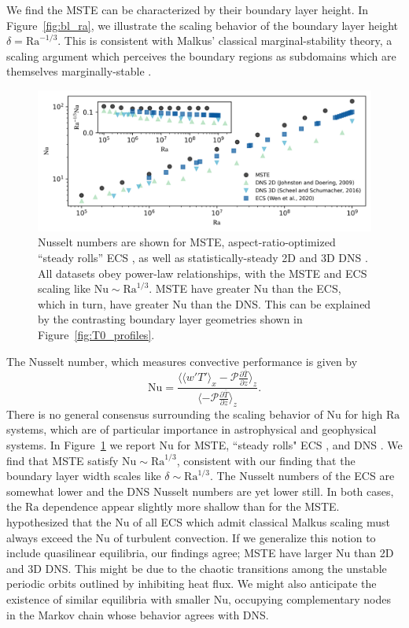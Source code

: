 \documentclass[reprint,amsmath,amssymb,aps]{revtex4-1}
\newcommand\Ra{\mathrm{Ra}}
\newcommand\Nu{\mathrm{Nu}}
\begin{document}
We find the MSTE can be characterized by their boundary layer height.
In Figure~\ref{fig:bl_ra}, we illustrate the scaling behavior of the boundary layer height $\delta = \Ra^{-1/3}$. 
This is consistent with Malkus' classical marginal-stability theory, a scaling argument which perceives the boundary regions as subdomains which are themselves marginally-stable \cite{Malkus_1954}.

\begin{figure}
    \centering
    \includegraphics[width=7.1in]{nu_ra.PNG}
    \caption{Nusselt numbers are shown for MSTE, aspect-ratio-optimized ``steady rolls'' ECS \cite{Wen}, as well as statistically-steady 2D and 3D DNS \cite{Johnston, Scheel_2016}.
    All datasets obey power-law relationships, with the MSTE and ECS scaling like $\Nu \sim\Ra^{1/3}$. 
    MSTE have greater $\Nu$ than the ECS, which in turn, have greater $\Nu$ than the DNS. 
    This can be explained by the contrasting boundary layer geometries shown in Figure~\ref{fig:T0_profiles}.}%
    \label{fig:nu_vs_ra}%
\end{figure}

The Nusselt number, which measures convective performance is given by
\begin{equation}
    \Nu = \frac{\langle \langle w'T' \rangle_x - \mathcal{P}\frac{\partial \bar{T}}{\partial z} \rangle_z}{\langle- \mathcal{P}\frac{\partial \bar{T}}{\partial z} \rangle_z}.
\end{equation}
There is no general consensus surrounding the scaling behavior of $\Nu$ for high $\Ra$ systems, which are of particular importance in astrophysical and geophysical systems. In Figure~\ref{fig:nu_vs_ra} we report $\Nu$ for MSTE, ``steady rolls" ECS \cite{Wen}, and DNS \cite{Scheel_2016, Johnston}. 
We find that MSTE satisfy $\Nu \sim\Ra^{1/3}$, consistent with our finding that the boundary layer width scales like $\delta \sim \Ra^{1/3}$.
The Nusselt numbers of the ECS are somewhat lower and the DNS Nusselt numbers are yet lower still.
In both cases, the $\Ra$ dependence appear slightly more shallow than for the MSTE.
\cite{Wen} hypothesized that the $\Nu$ of all ECS which admit classical Malkus scaling must always exceed the $\Nu$ of turbulent convection.
If we generalize this notion to include quasilinear equilibria, our findings agree; MSTE have larger $\Nu$ than 2D and 3D DNS.
This might be due to the chaotic transitions among the unstable periodic orbits outlined by \cite{Yalniz, Cvitanovic} inhibiting heat flux. 
We might also anticipate the existence of similar equilibria with smaller $\Nu$, occupying complementary nodes in the Markov chain whose behavior agrees with DNS. 
\end{document}
